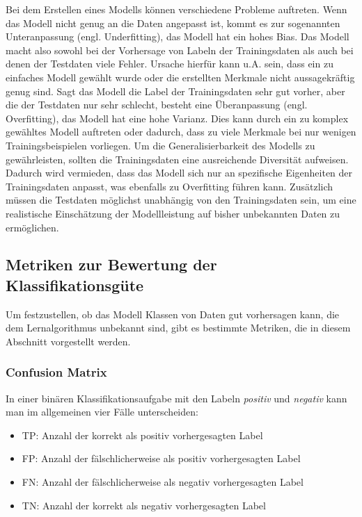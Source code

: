 Bei dem Erstellen eines Modells können verschiedene Probleme auftreten. Wenn das Modell nicht genug an die Daten angepasst ist, kommt es zur sogenannten Unteranpassung (engl. Underfitting), das Modell hat ein hohes Bias. Das Modell macht also sowohl bei der Vorhersage von Labeln der Trainingsdaten als auch bei denen der Testdaten viele Fehler. Ursache hierfür kann u.A. sein, dass ein zu einfaches Modell gewählt wurde oder die erstellten Merkmale nicht aussagekräftig genug sind. Sagt das Modell die Label der Trainingsdaten sehr gut vorher, aber die der Testdaten nur sehr schlecht, besteht eine Überanpassung (engl. Overfitting), das Modell hat eine hohe Varianz. Dies kann durch ein zu komplex gewähltes Modell auftreten oder dadurch, dass zu viele Merkmale bei nur wenigen Trainingsbeispielen vorliegen. Um die Generalisierbarkeit des Modells zu gewährleisten, sollten die Trainingsdaten eine ausreichende Diversität aufweisen. Dadurch wird vermieden, dass das Modell sich nur an spezifische Eigenheiten der Trainingsdaten anpasst, was ebenfalls zu Overfitting führen kann. Zusätzlich müssen die Testdaten möglichst unabhängig von den Trainingsdaten sein, um eine realistische Einschätzung der Modellleistung auf bisher unbekannten Daten zu ermöglichen.  \cite{burkov_machine_2019}

\subsection{Metriken zur Bewertung der Klassifikationsgüte}
Um festzustellen, ob das Modell Klassen von Daten gut vorhersagen kann, die dem Lernalgorithmus unbekannt sind, gibt es bestimmte Metriken, die in diesem Abschnitt vorgestellt werden.

\subsubsection*{Confusion Matrix}
In einer binären Klassifikationsaufgabe mit den Labeln \textit{positiv} und \textit{negativ} kann man im allgemeinen vier Fälle unterscheiden:
\begin{itemize}
\item \gls{TP}: Anzahl der korrekt als positiv vorhergesagten Label
\item \gls{FP}: Anzahl der fälschlicherweise als positiv vorhergesagten Label
\item \gls{FN}: Anzahl der fälschlicherweise als negativ vorhergesagten Label
\item \gls{TN}: Anzahl der korrekt als negativ vorhergesagten Label
\end{itemize}

